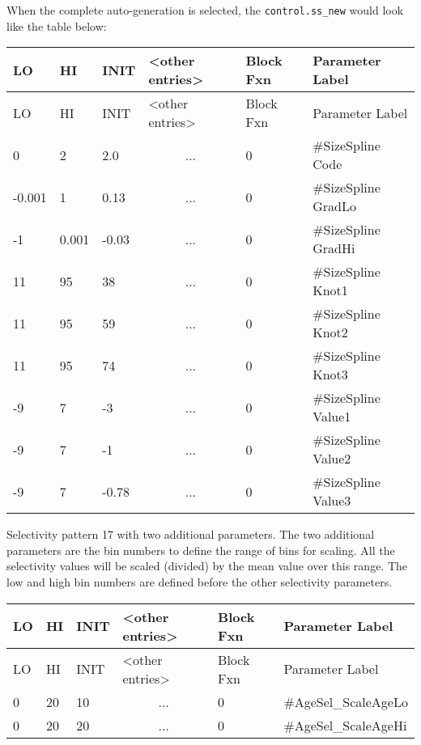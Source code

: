 When the complete auto-generation is selected, the \texttt{control.ss\_new} would look like the table below:	

\begin{longtable}{p{1cm} p{1cm} p{1cm} p{2.9cm} p{1.9cm} p{4.2cm}}
	\hline
	LO \Tstrut & HI & INIT & <other entries> & Block Fxn & Parameter Label \Bstrut\\
	\hline
	\endfirsthead

	\hline
	LO \Tstrut & HI & INIT & <other entries> & Block Fxn & Parameter Label \Bstrut\\
	\hline
	\endhead

	0 \Tstrut &		2 &   2.0 & \multicolumn{1}{c}{...} & 0 & \#SizeSpline Code \\
	-0.001    &		1 &  0.13 & \multicolumn{1}{c}{...} & 0 & \#SizeSpline GradLo \\
	-1        & 0.001 & -0.03 & \multicolumn{1}{c}{...} & 0 & \#SizeSpline GradHi \\
	11        &	   95 & 	38 & \multicolumn{1}{c}{...} & 0 & \#SizeSpline Knot1 \\
	11        &	   95 & 	59 & \multicolumn{1}{c}{...} & 0 & \#SizeSpline Knot2 \\
	11        &	   95 & 	74 & \multicolumn{1}{c}{...} & 0 & \#SizeSpline Knot3 \\
	-9        & 	7 & 	-3 & \multicolumn{1}{c}{...} & 0 & \#SizeSpline Value1 \\
	-9        &		7 & 	-1 & \multicolumn{1}{c}{...} & 0 & \#SizeSpline Value2 \\
	-9        &		7 & -0.78 & \multicolumn{1}{c}{...} & 0 & \#SizeSpline Value3 \Bstrut\\
	\hline
\end{longtable}

\hypertarget{RandomWalkScaling}{}
Selectivity pattern 17 with two additional parameters. The two additional parameters are the bin numbers to define the range of bins for scaling. All the selectivity values will be scaled (divided) by the mean value over this range. The low and high bin numbers are defined before the other selectivity parameters.

	\begin{longtable}{p{1cm} p{1cm} p{1cm} p{2.9cm} p{1.9cm} p{4.2cm}}
		\hline
		LO \Tstrut & HI & INIT & <other entries> & Block Fxn & Parameter Label \Bstrut\\
		\hline
		\endfirsthead
	
		\hline
		LO \Tstrut & HI & INIT & <other entries> & Block Fxn & Parameter Label \Bstrut\\
		\hline
		\endhead

		0 & 20 & 10 & \multicolumn{1}{c}{...} & 0 & \#AgeSel\_ScaleAgeLo \Tstrut\\
		0 & 20 & 20 & \multicolumn{1}{c}{...} & 0 & \#AgeSel\_ScaleAgeHi \Bstrut\\
		\hline
	\end{longtable}

